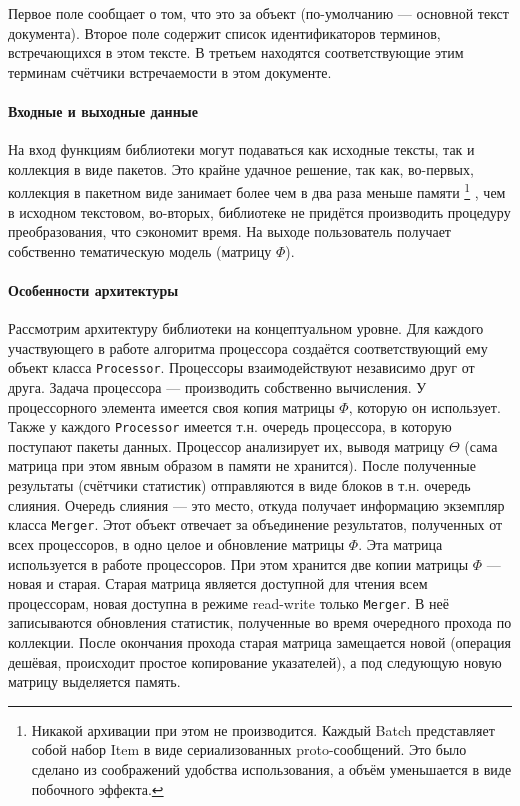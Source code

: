  Первое поле сообщает о том, что это за объект (по-умолчанию --- основной текст документа). Второе поле содержит список идентификаторов терминов, встречающихся в этом тексте. В третьем находятся соответствующие этим терминам счётчики встречаемости в этом документе.

\paragraph{Входные и выходные данные}
На вход функциям библиотеки могут подаваться как исходные тексты, так и коллекция в виде пакетов. Это крайне удачное решение, так как, во-первых, коллекция в пакетном виде занимает более чем в два раза меньше памяти
\footnote{Никакой архивации при этом не производится. Каждый Batch представляет собой набор Item в виде сериализованных proto-сообщений. Это было сделано из соображений удобства использования, а объём уменьшается в виде побочного эффекта.}
, чем в исходном текстовом, во-вторых, библиотеке не придётся производить процедуру преобразования, что сэкономит время. 
На выходе пользователь получает собственно тематическую модель (матрицу $\Phi$).

\paragraph{Особенности архитектуры} Рассмотрим архитектуру библиотеки на концептуальном уровне.
Для каждого участвующего в работе алгоритма процессора создаётся соответствующий ему объект класса \verb|Processor|. Процессоры взаимодействуют независимо друг от друга. Задача процессора --- производить собственно вычисления. У процессорного элемента имеется своя копия матрицы $\Phi$, которую он использует. Также у каждого \verb|Processor| имеется т.н. очередь процессора, в которую поступают пакеты данных. Процессор анализирует их, выводя матрицу $\Theta$ (сама матрица при этом явным образом в памяти не хранится). После  полученные результаты (счётчики статистик) отправляются в виде блоков в т.н. очередь слияния. Очередь слияния --- это место, откуда получает информацию экземпляр класса \verb|Merger|. Этот объект отвечает за объединение результатов, полученных от всех процессоров, в одно целое и обновление матрицы $\Phi$. Эта матрица используется в работе процессоров. При этом хранится две копии матрицы $\Phi$ --- новая и старая. Старая матрица является доступной для чтения всем процессорам, новая доступна в режиме read-write только \verb|Merger|. В неё записываются обновления статистик, полученные во время очередного прохода по коллекции. После окончания прохода старая матрица замещается новой (операция дешёвая, происходит простое копирование указателей), а под следующую новую матрицу выделяется память.


